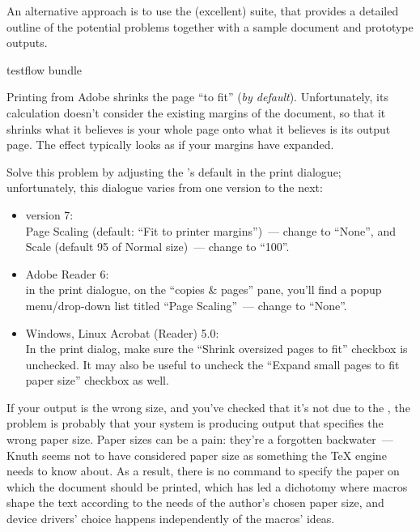 An alternative approach is to use the (excellent) 
suite, that provides a detailed outline of the potential problems
together with a sample document and prototype outputs.
\begin{ctanrefs}
\item[\nothtml{\rmfamily}testflow bundle]
\end{ctanrefs}


Printing from Adobe  shrinks the page ``to fit''
(\emph{by default}).  Unfortunately, its calculation doesn't consider
the existing margins of the document, so that it shrinks what it
believes is your whole page onto what it believes is its output page.
The effect typically looks as if your margins have expanded.

Solve this problem by adjusting the 's default in the
print dialogue; unfortunately, this dialogue varies from one version
to the next:
\begin{itemize}
\item {} version 7:\\
   Page Scaling (default: ``Fit to printer margins'')~--- change to
   ``None'', and\\
   Scale (default 95\textpercent{} of Normal size)~--- change to
   ``100\textpercent{}''.
\item  Adobe Reader 6:\\
  in the print dialogue, on the ``copies \& pages'' pane, you'll find a
  popup menu/drop-down list titled ``Page Scaling''~--- change to ``None''.
\item Windows, Linux Acrobat (Reader) 5.0:\\
  In the print dialog, make sure the ``Shrink oversized pages to fit''
  checkbox is unchecked.  It may also be useful to uncheck the
  ``Expand small pages to fit paper size'' checkbox as well.
\end{itemize}
 

If your output is the wrong size, and you've checked that it's not due
to the ,
the problem is probably that your \AllTeX{} system is producing output
that specifies the wrong paper size.  Paper sizes can be a pain:
they're a forgotten backwater~--- Knuth seems not to have considered
paper size as something the \TeX{} engine needs to know about.  As a
result, there is no  command to specify the paper on which
the document should be printed, which has led a dichotomy where macros
shape the text according to the needs of the author's chosen paper
size, and device drivers' choice happens independently of the macros'
ideas.

